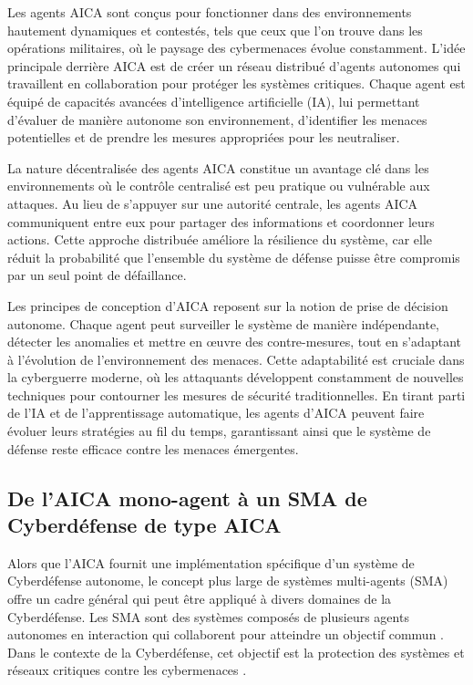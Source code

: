 Les agents AICA sont conçus pour fonctionner dans des environnements hautement dynamiques et contestés, tels que ceux que l'on trouve dans les opérations militaires, où le paysage des cybermenaces évolue constamment. L'idée principale derrière AICA est de créer un réseau distribué d'agents autonomes qui travaillent en collaboration pour protéger les systèmes critiques. Chaque agent est équipé de capacités avancées d'intelligence artificielle (IA), lui permettant d'évaluer de manière autonome son environnement, d'identifier les menaces potentielles et de prendre les mesures appropriées pour les neutraliser.

La nature décentralisée des agents AICA constitue un avantage clé dans les environnements où le contrôle centralisé est peu pratique ou vulnérable aux attaques. Au lieu de s'appuyer sur une autorité centrale, les agents AICA communiquent entre eux pour partager des informations et coordonner leurs actions. Cette approche distribuée améliore la résilience du système, car elle réduit la probabilité que l'ensemble du système de défense puisse être compromis par un seul point de défaillance.

Les principes de conception d'AICA reposent sur la notion de prise de décision autonome. Chaque agent peut surveiller le système de manière indépendante, détecter les anomalies et mettre en œuvre des contre-mesures, tout en s'adaptant à l'évolution de l'environnement des menaces. Cette adaptabilité est cruciale dans la cyberguerre moderne, où les attaquants développent constamment de nouvelles techniques pour contourner les mesures de sécurité traditionnelles. En tirant parti de l'IA et de l'apprentissage automatique, les agents d'AICA peuvent faire évoluer leurs stratégies au fil du temps, garantissant ainsi que le système de défense reste efficace contre les menaces émergentes.

\subsection{De l'AICA mono-agent à un SMA de Cyberdéfense de type AICA}


Alors que l'AICA fournit une implémentation spécifique d'un système de Cyberdéfense autonome, le concept plus large de systèmes multi-agents (SMA) offre un cadre général qui peut être appliqué à divers domaines de la Cyberdéfense. Les SMA sont des systèmes composés de plusieurs agents autonomes en interaction qui collaborent pour atteindre un objectif commun \cite{kott2018towards}. Dans le contexte de la Cyberdéfense, cet objectif est la protection des systèmes et réseaux critiques contre les cybermenaces \cite{jajodia2017autonomous}.


